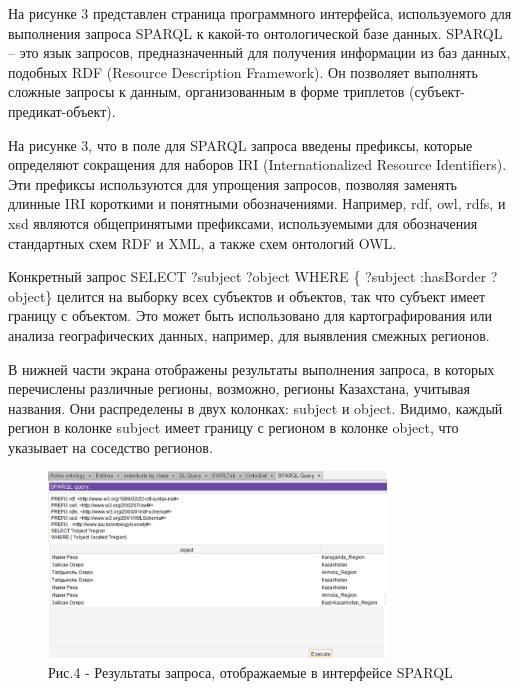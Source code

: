 \begin{multicols}{2}
На рисунке 3 представлен страница программного интерфейса, используемого
для выполнения запроса SPARQL к какой-то онтологической базе данных.
SPARQL -- это язык запросов, предназначенный для получения информации из
баз данных, подобных RDF (Resource Description Framework). Он позволяет
выполнять сложные запросы к данным, организованным в форме триплетов
(субъект-предикат-объект).

На рисунке 3, что в поле для SPARQL запроса введены префиксы, которые
определяют сокращения для наборов IRI (Internationalized Resource
Identifiers). Эти префиксы используются для упрощения запросов, позволяя
заменять длинные IRI короткими и понятными обозначениями. Например, rdf,
owl, rdfs, и xsd являются общепринятыми префиксами, используемыми для
обозначения стандартных схем RDF и XML, а также схем онтологий OWL.

Конкретный запрос SELECT ?subject ?object WHERE \{ ?subject :hasBorder
?object\} целится на выборку всех субъектов и объектов, так что субъект
имеет границу с объектом. Это может быть использовано для
картографирования или анализа географических данных, например, для
выявления смежных регионов.

В нижней части экрана отображены результаты выполнения запроса, в
которых перечислены различные регионы, возможно, регионы Казахстана,
учитывая названия. Они распределены в двух колонках: subject и object.
Видимо, каждый регион в колонке subject имеет границу с регионом в
колонке object, что указывает на соседство регионов.
\end{multicols}

\begin{figure}[H]
	\centering
	\includegraphics[width=0.8\textwidth]{assets/41}
	\caption*{Рис.4 - Результаты запроса, отображаемые в интерфейсе SPARQL}
\end{figure}

